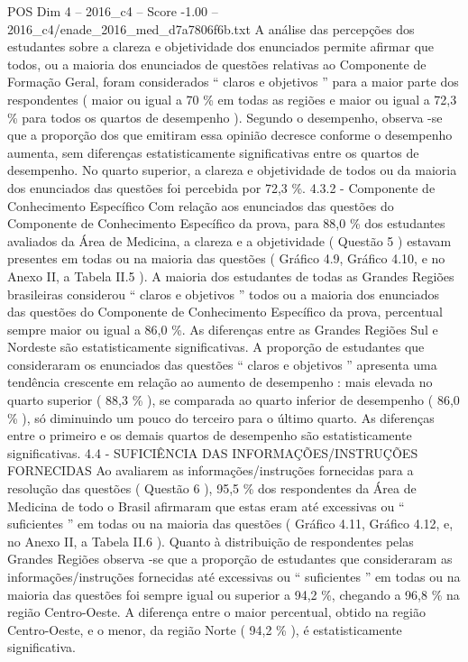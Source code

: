 \begin{textsample}{POS Dim 4 – 2016\_c4 – Score -1.00 – 2016\_c4/enade\_2016\_med\_d7a7806f6b.txt}
A análise das percepções dos estudantes sobre a clareza e objetividade dos enunciados permite afirmar que todos, ou a maioria dos enunciados de questões relativas ao Componente de Formação Geral, foram considerados “ claros e objetivos ” para a maior parte dos respondentes ( maior ou igual a 70 \% em todas as regiões e maior ou igual a 72,3 \% para todos os quartos de desempenho ).
Segundo o desempenho, observa -se que a proporção dos que emitiram essa opinião decresce conforme o desempenho aumenta, sem diferenças estatisticamente significativas entre os quartos de desempenho.
No quarto superior, a clareza e objetividade de todos ou da maioria dos enunciados das questões foi percebida por 72,3 \%. 4.3.2 - Componente de Conhecimento Específico Com relação aos enunciados das questões do Componente de Conhecimento Específico da prova, para 88,0 \% dos estudantes avaliados da Área de Medicina, a clareza e a objetividade ( Questão 5 ) estavam presentes em todas ou na maioria das questões ( Gráfico 4.9, Gráfico 4.10, e no Anexo II, a Tabela II.5 ).
A maioria dos estudantes de todas as Grandes Regiões brasileiras considerou “ claros e objetivos ” todos ou a maioria dos enunciados das questões do Componente de Conhecimento Específico da prova, percentual sempre maior ou igual a 86,0 \%.
As diferenças entre as Grandes Regiões Sul e Nordeste são estatisticamente significativas.
A proporção de estudantes que consideraram os enunciados das questões “ claros e objetivos ” apresenta uma tendência crescente em relação ao aumento de desempenho : mais elevada no quarto superior ( 88,3 \% ), se comparada ao quarto inferior de desempenho ( 86,0 \% ), só diminuindo um pouco do terceiro para o último quarto.
As diferenças entre o primeiro e os demais quartos de desempenho são estatisticamente significativas. 4.4 - SUFICIÊNCIA DAS INFORMAÇÕES/INSTRUÇÕES FORNECIDAS Ao avaliarem as informações/instruções fornecidas para a resolução das questões ( Questão 6 ), 95,5 \% dos respondentes da Área de Medicina de todo o Brasil afirmaram que estas eram até excessivas ou “ suficientes ” em todas ou na maioria das questões ( Gráfico 4.11, Gráfico 4.12, e, no Anexo II, a Tabela II.6 ).
Quanto à distribuição de respondentes pelas Grandes Regiões observa -se que a proporção de estudantes que consideraram as informações/instruções fornecidas até excessivas ou “ suficientes ” em todas ou na maioria das questões foi sempre igual ou superior a 94,2 \%, chegando a 96,8 \% na região Centro-Oeste.
A diferença entre o maior percentual, obtido na região Centro-Oeste, e o menor, da região Norte ( 94,2 \% ), é estatisticamente significativa.

\end{textsample}
